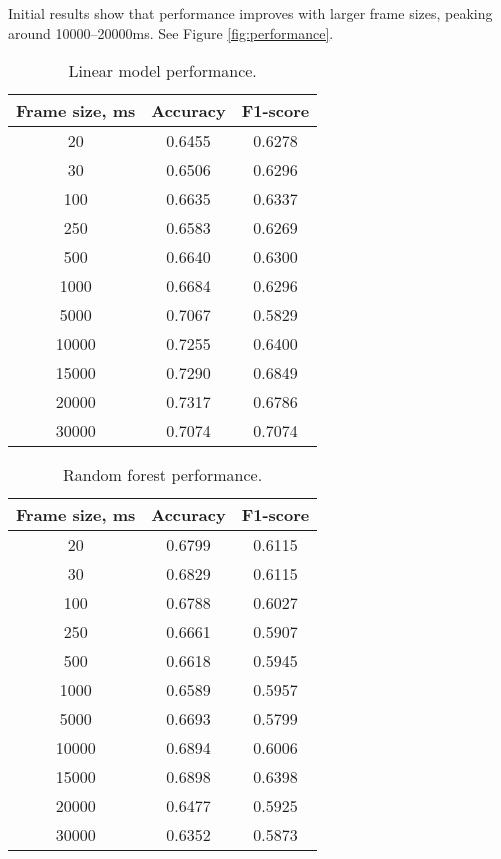 \documentclass[conference]{IEEEtran}
\begin{document}
Initial results show that performance improves with larger frame sizes, peaking around 10000–20000ms. See Figure \ref{fig:performance}.


\begin{table}[h]
\centering
\caption{Linear model performance.}
\begin{tabular}{|c|c|c|}
\hline
\textbf{Frame size, ms} & \textbf{Accuracy} & \textbf{F1-score}\\
\hline
20 & 0.6455 & 0.6278 \\
\hline
30 & 0.6506 & 0.6296 \\
\hline
100 & 0.6635 & 0.6337 \\
\hline
250 & 0.6583 & 0.6269 \\
\hline
500 & 0.6640 & 0.6300 \\
\hline
1000 & 0.6684 & 0.6296 \\
\hline
5000 & 0.7067 & 0.5829 \\
\hline
10000 & 0.7255 & 0.6400 \\
\hline
15000 & 0.7290 & 0.6849 \\
\hline
20000 & 0.7317 & 0.6786 \\
\hline
30000 & 0.7074 & 0.7074 \\
\hline
\end{tabular}
\label{tab:linear_model_perf}
\end{table}


\begin{table}[h]
\centering
\caption{Random forest performance.}
\begin{tabular}{|c|c|c|}
\hline
\textbf{Frame size, ms} & \textbf{Accuracy} & \textbf{F1-score}\\
\hline
20 & 0.6799 & 0.6115 \\
\hline
30 & 0.6829 & 0.6115 \\
\hline
100 & 0.6788 & 0.6027 \\
\hline
250 & 0.6661 & 0.5907 \\
\hline
500 & 0.6618 & 0.5945 \\
\hline
1000 & 0.6589 & 0.5957 \\
\hline
5000 & 0.6693 & 0.5799 \\
\hline
10000 & 0.6894 & 0.6006 \\
\hline
15000 & 0.6898 & 0.6398 \\
\hline
20000 & 0.6477 & 0.5925 \\
\hline
30000 & 0.6352 & 0.5873 \\
\hline
\end{tabular}
\label{tab:linear_model_perf}
\end{table}
\end{document}
